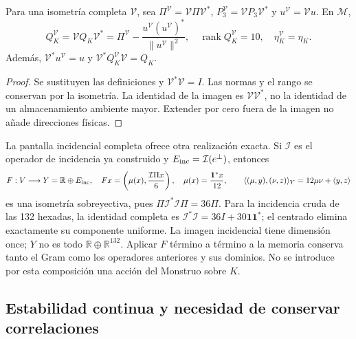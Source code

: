 \begin{proposition}
\label{lib01:transporte-direccion}
Para una isometría completa \(\mathcal V\), sea
\(\Pi^{\mathcal V}=\mathcal V\Pi\mathcal V^*\),
\(P_3^{\mathcal V}=\mathcal VP_3\mathcal V^*\) y
\(u^{\mathcal V}=\mathcal Vu\). En \(\mathcal M\),
\[
 Q_K^{\mathcal V}
 =\mathcal VQ_K\mathcal V^*
 =\Pi^{\mathcal V}
 -\frac{u^{\mathcal V}(u^{\mathcal V})^*}{\|u^{\mathcal V}\|^2},
 \quad \operatorname{rank}Q_K^{\mathcal V}=10,
 \quad \eta_K^{\mathcal V}=\eta_K.
\]
Además, \(\mathcal V^*u^{\mathcal V}=u\) y
\(\mathcal V^*Q_K^{\mathcal V}\mathcal V=Q_K\).
\end{proposition}
\begin{proof}
Se sustituyen las definiciones y \(\mathcal V^*\mathcal V=I\).
Las normas y el rango se conservan por la isometría. La identidad de la
imagen es \(\mathcal V\mathcal V^*\), no la identidad de un
almacenamiento ambiente mayor. Extender por cero fuera de la imagen no
añade direcciones físicas.
\end{proof}

La pantalla incidencial completa ofrece otra realización exacta. Si
\(\mathcal I\) es el operador de incidencia ya construido y
\(E_{\rm inc}=\mathcal I(e^\perp)\), entonces
\begin{equation}
 F:V\longrightarrow Y=\mathbb R\oplus E_{\rm inc},\quad
 Fx=\left(\mu(x),\frac{\mathcal I\Pi x}{6}\right),\quad
 \mu(x)=\frac{\mathbf1^*x}{12},\qquad
 \langle(\mu,y),(\nu,z)\rangle_Y=12\mu\nu+\langle y,z\rangle
 \label{lib01:incidencia-F}
\end{equation}
es una isometría sobreyectiva, pues
\(\Pi\mathcal I^*\mathcal I\Pi=36\Pi\). Para la incidencia
cruda de las 132 hexadas, la identidad completa es
\(\mathcal I^*\mathcal I=36I+30\mathbf1\mathbf1^*\); el
centrado elimina exactamente su componente uniforme. La imagen incidencial tiene
dimensión once; \(Y\) no es todo \(\mathbb R\oplus\mathbb R^{132}\).
Aplicar \(F\) término a término a la memoria conserva tanto el Gram
como los operadores anteriores y sus dominios. No se introduce por esta
composición una acción del Monstruo sobre \(K\).

\subsection{Estabilidad continua y necesidad de conservar correlaciones}
\label{lib01:ruido}

